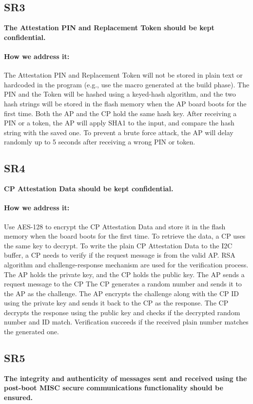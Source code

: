 \documentclass[11pt,oneside,onecolumn,letterpaper]{article}
\newcounter{alg}
\begin{document}
	\subsection{SR3}
	\textbf{The Attestation PIN and Replacement Token should be kept confidential.}
	\paragraph{How we address it:}
	The Attestation PIN and Replacement Token will not be stored in plain text or hardcoded in the program (e.g., use the macro generated at the build phase).
	The PIN and the Token will be hashed using a keyed-hash algorithm,
	and the two hash strings will be stored in the flash memory when the AP board boots for the first time.
	Both the AP and the CP hold the same hash key.
	After receiving a PIN or a token,
	the AP will apply SHA1 to the input,
	and compare the hash string with the saved one.
	To prevent a brute force attack,
	the AP will delay randomly up to 5 seconds after receiving a wrong PIN or token.
	
	\subsection{SR4}
	\textbf{CP Attestation Data should be kept confidential.}
	\paragraph{How we address it:}
	Use AES-128 to encrypt the CP Attestation Data and store it in the flash memory when the board boots for the first time.
	To retrieve the data,
	a CP uses the same key to decrypt.
	To write the plain CP Attestation Data to the I2C buffer,
	a CP needs to verify if the request message is from the valid AP.
	RSA algorithm and challenge-response mechanism are used for the verification process.
	The AP holds the private key,
	and the CP holds the public key.
	The AP sends a request message to the CP
	The CP generates a random number and sends it to the AP as the challenge.
	The AP encrypts the challenge along with the CP ID using the private key and sends it back to the CP as the response.
	The CP decrypts the response using the public key and checks if the decrypted random number and ID match.
	Verification succeeds if the received plain number matches the generated one.
	
	\subsection{SR5}
	\textbf{The integrity and authenticity of messages sent and received using the post-boot MISC secure communications functionality should be ensured.}
\end{document}
